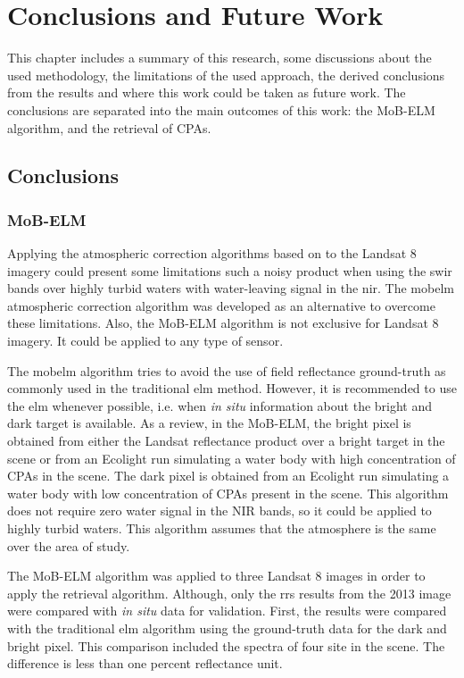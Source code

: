 \chapter{Conclusions and Future Work}
This chapter includes a summary of this research, some discussions about the used methodology, the limitations of the used approach, the derived conclusions from the results and where this work could be taken as future work. The conclusions are separated into the main outcomes of this work: the MoB-ELM algorithm, and the retrieval of CPAs.

\section{Conclusions}
\label{sec:conc}
\subsection{MoB-ELM}
Applying the atmospheric correction algorithms based on \cite{Gordon:1994} to the Landsat 8 imagery could present some limitations such a noisy product when using the \gls{swir} bands over highly turbid waters with water-leaving signal in the \gls{nir}. The \gls{mobelm} atmospheric correction algorithm \cite{Concha2014SPIE} was developed as an alternative to overcome these limitations. Also, the MoB-ELM algorithm is not exclusive for Landsat 8 imagery. It could be applied to any type of sensor.

The \gls{mobelm} algorithm tries to avoid the use of field reflectance ground-truth as commonly used in the traditional \gls{elm} method. However, it is recommended to use the \gls{elm} whenever possible, i.e. when {\it in situ} information about the bright and dark target is available. As a review, in the MoB-ELM, the bright pixel is obtained from either the Landsat reflectance product over a bright target in the scene or from an Ecolight run simulating a water body with high concentration of CPAs in the scene. The dark pixel is obtained from an Ecolight run simulating a water body with low concentration of CPAs present in the scene. This algorithm does not require zero water signal in the NIR bands, so it could be applied to highly turbid waters. This algorithm assumes that the atmosphere is the same over the area of study.

The MoB-ELM algorithm was applied to {three } Landsat 8 images in order to apply the retrieval algorithm. Although, only the \gls{rrs} results from the 2013 image were compared with {\it in situ} data for validation. First, the results were compared with the traditional \gls{elm} algorithm using the ground-truth data for the dark and bright pixel. This comparison included the spectra of four site in the scene. The difference is less than one percent reflectance unit. 

